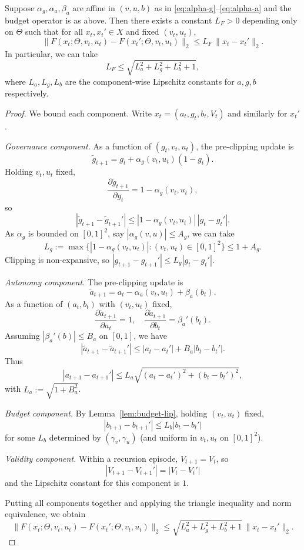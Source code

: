 \documentclass[11pt]{article}
\begin{document}
\begin{theorem}
\label{thm:F-lip}
Suppose $\alpha_g,\alpha_a,\beta_a$ are affine in $(v,u,b)$ as in \eqref{eq:alpha-g}--\eqref{eq:alpha-a} and the budget operator is as above.
Then there exists a constant $L_F > 0$ depending only on $\Theta$ such that for all $x_t,x_t' \in X$ and fixed $(v_t,u_t)$,
\[
  \| F(x_t;\Theta,v_t,u_t) - F(x_t';\Theta,v_t,u_t) \|_2
  \le L_F \, \|x_t - x_t'\|_2.
\]
In particular, we can take
\[
  L_F \le \sqrt{ L_a^2 + L_g^2 + L_b^2 + 1 },
\]
where $L_a,L_g,L_b$ are the component-wise Lipschitz constants for $a,g,b$ respectively.
\end{theorem}

\begin{proof}
We bound each component.
Write $x_t = (a_t,g_t,b_t,V_t)$ and similarly for $x_t'$.

\emph{Governance component.}
As a function of $(g_t,v_t,u_t)$, the pre-clipping update is
\[
  \tilde{g}_{t+1} = g_t + \alpha_g(v_t,u_t)(1-g_t).
\]
Holding $v_t,u_t$ fixed,
\[
  \frac{\partial \tilde{g}_{t+1}}{\partial g_t}
    = 1 - \alpha_g(v_t,u_t),
\]
so
\[
  |\tilde{g}_{t+1} - \tilde{g}_{t+1}'|
  \le |1 - \alpha_g(v_t,u_t)| \, |g_t - g_t'|.
\]
As $\alpha_g$ is bounded on $[0,1]^2$, say $|\alpha_g(v,u)| \le A_g$, we can take
\[
  L_g := \max\{ |1 - \alpha_g(v_t,u_t)| : (v_t,u_t)\in[0,1]^2 \}
  \le 1 + A_g.
\]
Clipping is non-expansive, so $|g_{t+1}-g_{t+1}'| \le L_g |g_t - g_t'|$.

\emph{Autonomy component.}
The pre-clipping update is
\[
  \tilde{a}_{t+1} = a_t - \alpha_a(v_t,u_t) + \beta_a(b_t).
\]
As a function of $(a_t,b_t)$ with $(v_t,u_t)$ fixed,
\[
  \frac{\partial \tilde{a}_{t+1}}{\partial a_t} = 1, \quad
  \frac{\partial \tilde{a}_{t+1}}{\partial b_t} = \beta_a'(b_t).
\]
Assuming $|\beta_a'(b)| \le B_a$ on $[0,1]$, we have
\[
  |\tilde{a}_{t+1} - \tilde{a}_{t+1}'|
  \le |a_t - a_t'|
     + B_a |b_t - b_t'|.
\]
Thus
\[
  |a_{t+1} - a_{t+1}'|
  \le L_a \sqrt{ (a_t-a_t')^2 + (b_t-b_t')^2 },
\]
with $L_a := \sqrt{1 + B_a^2}$.

\emph{Budget component.}
By Lemma~\ref{lem:budget-lip}, holding $(v_t,u_t)$ fixed,
\[
  |b_{t+1} - b_{t+1}'|
  \le L_b |b_t - b_t'|
\]
for some $L_b$ determined by $(\gamma_v,\gamma_u)$ (and uniform in $v_t,u_t$ on $[0,1]^2$).

\emph{Validity component.}
Within a recursion episode, $V_{t+1} = V_t$, so
\[
  |V_{t+1} - V_{t+1}'| = |V_t - V_t'|
\]
and the Lipschitz constant for this component is $1$.

Putting all components together and applying the triangle inequality and norm equivalence, we obtain
\[
  \| F(x_t;\Theta,v_t,u_t) - F(x_t';\Theta,v_t,u_t) \|_2
  \le \sqrt{L_a^2 + L_g^2 + L_b^2 + 1}\,\|x_t - x_t'\|_2.
\]
\end{proof}
\end{document}
